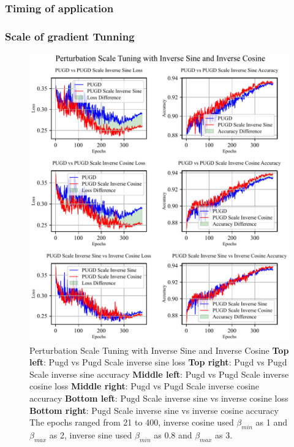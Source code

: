 \documentclass[10pt,twocolumn,letterpaper]{article}
\begin{document}
\cite{ishida2021needzerotrainingloss}

\subsubsection{Timing of application}
\label{subsec:4.1.2}

\subsubsection{Scale of gradient Tunning}
\label{subsec:4.1.4}

\begin{figure}[htbp]
	\center
	\vspace{-10pt} 
	\includegraphics[width=\columnwidth]{images/PUGDScaleInv.pdf}
	\caption{Perturbation Scale Tuning with Inverse Sine and Inverse Cosine
	\textbf{Top left}: Pugd vs Pugd Scale inverse sine loss \textbf{Top right}: Pugd vs Pugd Scale inverse sine accuracy
    \textbf{Middle left}: Pugd vs Pugd Scale inverse cosine loss \textbf{Middle right}: Pugd vs Pugd Scale inverse cosine accuracy
	\textbf{Bottom left}: Pugd Scale inverse sine vs inverse cosine loss \textbf{Bottom right}: Pugd Scale inverse sine vs inverse cosine accuracy
	The epochs ranged from 21 to 400, inverse cosine used $\beta_{min}$ as 1 and $\beta_{max}$ as 2, inverse sine used $\beta_{min}$ as 0.8 and $\beta_{max}$ as 3.
	}
	\label{fig:PUGDScaleInv}
\end{figure}
\end{document}
